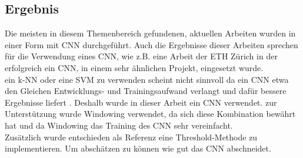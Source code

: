 \subsection{Ergebnis}

Die meisten in diesem Themenbereich gefundenen, aktuellen Arbeiten wurden in einer Form mit \gls{CNN} durchgeführt. Auch die Ergebnisse dieser Arbeiten sprechen für die Verwendung eines \gls{CNN}, wie z.B. eine Arbeit der ETH Zürich \parencite{gomez2018thermal} in der erfolgreich ein \gls{CNN}, in einem sehr ähnlichen Projekt, eingesetzt wurde. \\
ein \gls{k-NN} oder eine \gls{SVM} zu verwenden scheint nicht sinnvoll da ein \gls{CNN} etwa den Gleichen Entwicklungs- und Trainingsaufwand verlangt und dafür bessere Ergebnisse liefert \parencite{comparison_algorithms}.
Deshalb wurde in dieser Arbeit ein \gls{CNN} verwendet. zur Unterstützung wurde Windowing verwendet, da sich diese Kombination bewährt hat \parencite{gomez2018thermal} und da Windowing das Training des CNN sehr vereinfacht.\\
Zusätzlich wurde entschieden als Referenz eine Threshold-Methode zu implementieren. Um abschätzen zu können wie gut das \gls{CNN} abschneidet.





